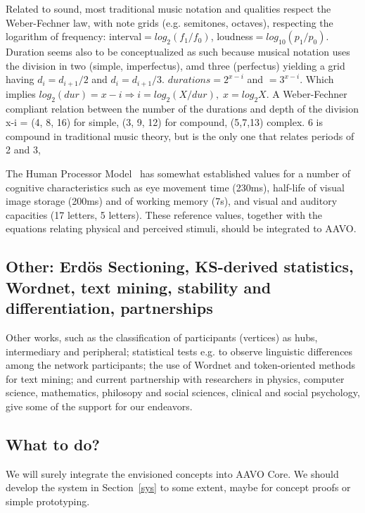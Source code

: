 \documentclass[letterpaper,10pt]{article}
\begin{document}
Related to sound, most traditional music notation and qualities
respect the Weber-Fechner law, with note grids (e.g. semitones, octaves),
respecting the logarithm of frequency: interval$=log_2(f_1/f_0)$,
loudness$=log_{10}(p_1/p_0)$.
Duration seems also to be conceptualized as such
because musical notation uses the division in two (simple, imperfectus),
amd three (perfectus) yielding a grid having
$d_i=d_{i+1}/2$ and $d_i=d_{i+1}/3$.
$durations=2^{x-i}$ and $=3^{x-i}$.
Which implies $log_2(dur) = x-i \Rightarrow i = log_2(X/dur),\;x = log_2X$.
A Weber-Fechner compliant relation
between the number of the durations and
depth of the division x-i = (4, 8, 16) for simple,
(3, 9, 12) for compound,
(5,7,13) complex.
6 is compound in traditional music theory,
but is the only one that relates periods of 2 and 3,

The Human Processor Model~\cite{HPM}
has somewhat established values for
a number of cognitive characteristics such as eye movement time (230ms),
half-life of visual image storage (200ms) and 
of
working memory (7s),
and visual and auditory capacities (17 letters, 5 letters).
These reference values, together with the
equations relating physical and perceived stimuli,
should be integrated to AAVO.

\subsection{Other: Erdös Sectioning, KS-derived statistics, Wordnet,
text mining, stability and differentiation, partnerships}\label{other}
Other works, such as the classification of participants (vertices) as
hubs, intermediary and peripheral; statistical tests e.g. to
observe linguistic differences among the network participants;
the use of Wordnet and token-oriented methods for text mining;
and current partnership with researchers in physics, computer science,
mathematics, philosopy and social sciences, clinical and social psychology,
give some of the support for our endeavors.~\cite{tese}

\subsection{What to do?}
We will surely integrate the envisioned concepts into AAVO Core.
We should develop the system in Section~\ref{sys} to some extent,
maybe for concept proofs or simple prototyping.
\end{document}
